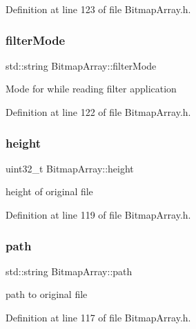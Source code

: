 Definition at line 123 of file Bitmap\+Array.\+h.

\mbox{\label{classBitmapArray_adfd3e5a1eed42e37b22a4f2f2560ad67}} 
\subsubsection{\texorpdfstring{filterMode}{filterMode}}
{\footnotesize\ttfamily std\+::string Bitmap\+Array\+::filter\+Mode\hspace{0.3cm}{\ttfamily [private]}}

Mode for while reading filter application 

Definition at line 122 of file Bitmap\+Array.\+h.

\mbox{\label{classBitmapArray_adb8d1a8fcc55c3884ad3eea71c6042be}} 
\subsubsection{\texorpdfstring{height}{height}}
{\footnotesize\ttfamily uint32\+\_\+t Bitmap\+Array\+::height\hspace{0.3cm}{\ttfamily [private]}}

height of original file 

Definition at line 119 of file Bitmap\+Array.\+h.

\mbox{\label{classBitmapArray_a3a3e1fbdd198c6731c7f6e20fb492445}} 
\subsubsection{\texorpdfstring{path}{path}}
{\footnotesize\ttfamily std\+::string Bitmap\+Array\+::path\hspace{0.3cm}{\ttfamily [private]}}

path to original file 

Definition at line 117 of file Bitmap\+Array.\+h.

\mbox{\label{classBitmapArray_a44f51b2c1ecde3f9aa504df25d65b6c9}} 
